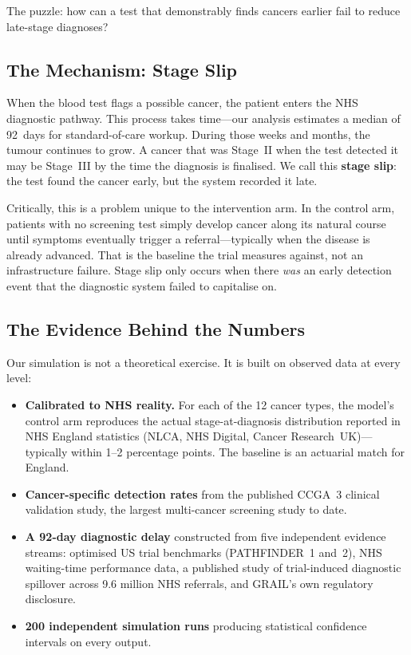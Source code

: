\documentclass[11pt,a4paper]{article}
\begin{document}
The puzzle: how can a test that demonstrably finds cancers earlier
fail to reduce late-stage diagnoses?

\subsection*{The Mechanism: Stage Slip}

When the blood test flags a possible cancer, the patient enters the
NHS diagnostic pathway. This process takes time---our analysis
estimates a median of 92~days for standard-of-care workup. During
those weeks and months, the tumour continues to grow. A cancer that
was Stage~II when the test detected it may be Stage~III by the time
the diagnosis is finalised. We call this \textbf{stage slip}: the
test found the cancer early, but the system recorded it late.

Critically, this is a problem unique to the intervention arm. In the
control arm, patients with no screening test simply develop cancer
along its natural course until symptoms eventually trigger a
referral---typically when the disease is already advanced. That is
the baseline the trial measures against, not an infrastructure
failure. Stage slip only occurs when there \emph{was} an early
detection event that the diagnostic system failed to capitalise on.

\subsection*{The Evidence Behind the Numbers}

Our simulation is not a theoretical exercise. It is built on
observed data at every level:

\begin{itemize}[nosep, leftmargin=2em]
\item \textbf{Calibrated to NHS reality.} For each of the 12 cancer
  types, the model's control arm reproduces the actual
  stage-at-diagnosis distribution reported in NHS England statistics
  (NLCA, NHS Digital, Cancer Research~UK)---typically within 1--2
  percentage points. The baseline is an actuarial match for England.

\item \textbf{Cancer-specific detection rates} from the published
  CCGA~3 clinical validation study, the largest multi-cancer
  screening study to date.

\item \textbf{A 92-day diagnostic delay} constructed from five
  independent evidence streams: optimised US trial benchmarks
  (PATHFINDER~1 and~2), NHS waiting-time performance data, a
  published study of trial-induced diagnostic spillover across 9.6
  million NHS referrals, and GRAIL's own regulatory disclosure.

\item \textbf{200 independent simulation runs} producing statistical
  confidence intervals on every output.
\end{itemize}
\end{document}
